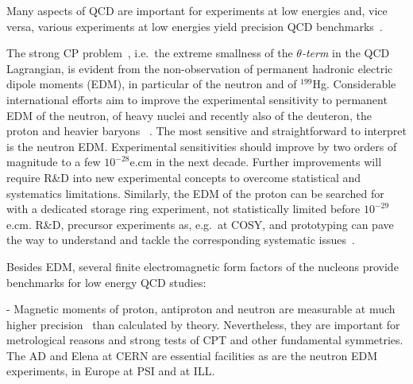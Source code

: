  
 Many aspects of QCD   are important for experiments at low energies and, vice versa, various experiments at low energies yield precision QCD benchmarks~\cite{Alemany:2019vsk,Dainese:2019xrz}.

The strong CP problem~\cite{Cheng:1987gp,Pospelov:2005pr}, i.e.\ the extreme smallness of the  {\it $\theta$-term} in the QCD Lagrangian, is evident from the non-observation of permanent hadronic electric dipole moments (EDM), in particular of the neutron and of $^{199}$Hg. Considerable international efforts aim to improve the experimental sensitivity to permanent EDM of the neutron, of heavy nuclei and recently also of the deuteron, the proton and heavier baryons ~\cite{Engel:2013lsa,Semertzidis:2003iq,Afach:2015sja,Lenisa:2017okq,Chupp:2017rkp}. The most sensitive and straightforward to interpret is the neutron EDM. Experimental sensitivities should improve by two orders of magnitude to a few $10^{-28}$e.cm in the next decade. Further improvements will require R\&D into new experimental concepts to overcome statistical and systematics limitations. Similarly, the EDM of the proton can be searched for with a dedicated storage ring experiment, not statistically limited before $10^{-29}$e.cm. R\&D, precursor experiments as, e.g.\ at COSY, and prototyping can pave the way to understand and tackle the corresponding systematic issues~\cite{Lenisa:2017okq}.



Besides EDM, several finite electromagnetic form factors of the nucleons provide benchmarks for low energy QCD studies:

-          Magnetic moments of proton, antiproton and neutron are measurable at much higher precision~\cite{Mooser:2014vla,Smorra:2018syp,Smorra:2016vxa,Afach:2014fha} than calculated by theory. Nevertheless, they are important for metrological reasons and strong tests of CPT and other fundamental symmetries. The AD and Elena at CERN are essential facilities as are the neutron EDM experiments, in Europe at PSI and at ILL.

